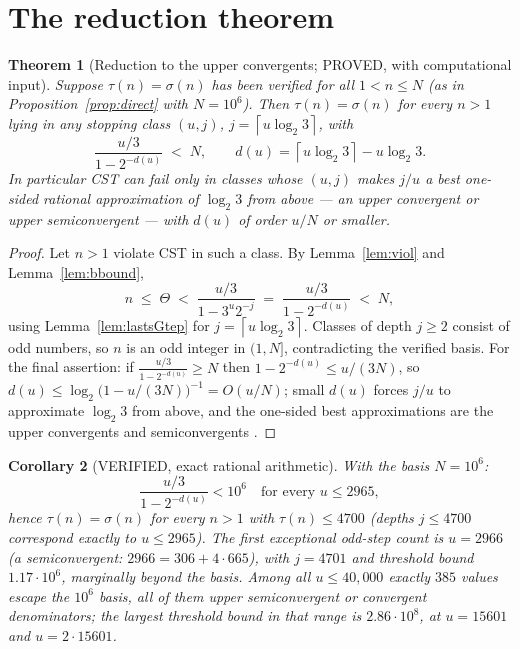\documentclass[10pt]{article}
\newtheorem{theorem}{Theorem}[section]
\newtheorem{corollary}[theorem]{Corollary}
\theoremstyle{definition}
\theoremstyle{remark}
\newcommand{\ceil}[1]{\left\lceil #1 \right\rceil}
\newcommand{\lb}{\log_2 3}
\begin{document}
\section{The reduction theorem}\label{sec:reduction}

\begin{theorem}[Reduction to the upper convergents; PROVED, with
computational input]\label{thm:reduction}
Suppose $\tau(n) = \sigma(n)$ has been verified for all $1 < n \le N$
(as in Proposition~\ref{prop:direct} with $N = 10^{6}$). Then
$\tau(n) = \sigma(n)$ for every $n > 1$ lying in any stopping class
$(u, j)$, $j = \ceil{u\lb}$, with
\[
\frac{u/3}{1 - 2^{-d(u)}} \;<\; N, \qquad d(u) = \ceil{u\lb} - u\lb .
\]
In particular CST can fail only in classes whose $(u,j)$ makes $j/u$ a best
one-sided rational approximation of $\lb$ from above --- an upper convergent
or upper semiconvergent --- with $d(u)$ of order $u/N$ or smaller.
\end{theorem}

\begin{proof}
Let $n > 1$ violate CST in such a class. By Lemma~\ref{lem:viol} and
Lemma~\ref{lem:bbound},
\[
n \;\le\; \Theta \;<\; \frac{u/3}{1 - 3^{u}2^{-j}} \;=\;
\frac{u/3}{1 - 2^{-d(u)}} \;<\; N,
\]
using Lemma~\ref{lem:lastsGtep} for $j = \ceil{u\lb}$. Classes of depth
$j \ge 2$ consist of odd numbers, so $n$ is an odd integer in $(1, N]$,
contradicting the verified basis. For the final assertion: if
$\tfrac{u/3}{1-2^{-d(u)}} \ge N$ then $1 - 2^{-d(u)} \le u/(3N)$, so
$d(u) \le \log_2\bigl(1 - u/(3N)\bigr)^{-1} = O(u/N)$; small $d(u)$ forces
$j/u$ to approximate $\lb$ from above, and the one-sided best approximations
are the upper convergents and semiconvergents \cite{Khinchin}.
\end{proof}

\begin{corollary}[VERIFIED, exact rational arithmetic]\label{cor:4700}
With the basis $N = 10^{6}$:
\[
\frac{u/3}{1 - 2^{-d(u)}} < 10^{6} \quad\text{for every } u \le 2965,
\]
hence $\tau(n) = \sigma(n)$ for every $n > 1$ with $\tau(n) \le 4700$
(depths $j \le 4700$ correspond exactly to $u \le 2965$). The first
exceptional odd-step count is $u = 2966$ (a semiconvergent:
$2966 = 306 + 4\cdot 665$), with $j = 4701$ and threshold bound
$1.17 \cdot 10^{6}$, marginally beyond the basis. Among all
$u \le 40{,}000$ exactly $385$ values escape the $10^{6}$ basis, all of them
upper semiconvergent or convergent denominators; the largest threshold bound
in that range is $2.86\cdot 10^{8}$, at $u = 15601$ and $u = 2\cdot 15601$.
\end{corollary}
\end{document}
